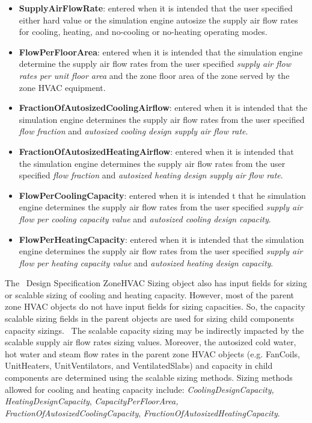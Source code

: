 \begin{itemize}
\item
  \textbf{SupplyAirFlowRate}: entered when it is intended that the user specified either hard value or the simulation engine autosize the supply air flow rates for cooling, heating, and no-cooling or no-heating operating modes.
\item
  \textbf{FlowPerFloorArea}: entered when it is intended that the simulation engine determine the supply air flow rates from the user specified \emph{supply air flow rates per unit floor area} and the zone floor area of the zone served by the zone HVAC equipment.
\item
  \textbf{FractionOfAutosizedCoolingAirflow}: entered when it is intended that the simulation engine determines the supply air flow rates from the user specified \emph{flow fraction} and \emph{autosized cooling design supply air flow rate}.
\item
  \textbf{FractionOfAutosizedHeatingAirflow}: entered when it is intended that the simulation engine determines the supply air flow rates from the user specified \emph{flow fraction} and \emph{autosized heating design supply air flow rate}.
\item
  \textbf{FlowPerCoolingCapacity}: entered when it is intended t that he simulation engine determines the supply air flow rates from the user specified \emph{supply air flow per cooling capacity value} and \emph{autosized cooling design capacity}.
\item
  \textbf{FlowPerHeatingCapacity}: entered when it is intended that the simulation engine determines the supply air flow rates from the user specified \emph{supply air flow per heating capacity value} and \emph{autosized heating design capacity}.
\end{itemize}

The~ Design Specification ZoneHVAC Sizing object also has input fields for sizing or scalable sizing of cooling and heating capacity. However, most of the parent zone HVAC objects do not have input fields for sizing capacities. So, the capacity scalable sizing fields in the parent objects are used for sizing child components capacity sizings.~ The scalable capacity sizing may be indirectly impacted by the scalable supply air flow rates sizing values. Moreover, the autosized cold water, hot water and steam flow rates in the parent zone HVAC objects (e.g. FanCoils, UnitHeaters, UnitVentilators, and VentilatedSlabs) and capacity in child components are determined using the scalable sizing methods. Sizing methods allowed for cooling and heating capacity include: \emph{CoolingDesignCapacity, HeatingDesignCapacity}, \emph{CapacityPerFloorArea, FractionOfAutosizedCoolingCapacity}, \emph{FractionOfAutosizedHeatingCapacity}.

